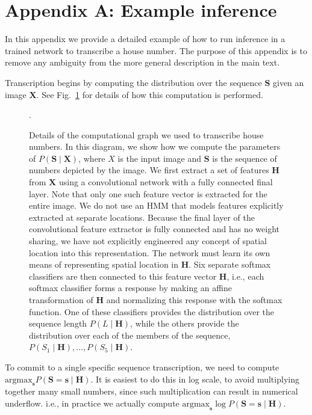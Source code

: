 \documentclass{article} \usepackage{comment}
\begin{document}
\section*{Appendix A: Example inference}

In this appendix we provide a detailed example of how to run inference in a trained network
to transcribe a house number. The purpose of this appendix is to remove any ambiguity from
the more general description in the main text.

Transcription begins by computing the distribution over the sequence $\mathbf{S}$ given an
image $\mathbf{X}$. See Fig.~\ref{fig:detailed_mlp} for details of how this computation is
performed.

\begin{figure}[hb]
\begin{centering}
\caption{Details of the computational graph we used to transcribe house numbers.
In this diagram, we show how we compute the parameters of $P( \mathbf{S} \mid \mathbf{X})$,
where $X$ is the input image and $\mathbf{S}$ is the sequence of numbers depicted by
the image. We first extract a set of features $\mathbf{H}$ from $\mathbf{X}$ using a convolutional
network with a fully connected final layer. Note that only one such feature vector is extracted
for the entire image. We do not use an HMM that models features explicitly extracted at separate
locations. Because the final layer of the convolutional feature extractor is fully connected and
has no weight sharing, we have not explicitly engineered any concept of spatial location into this
representation. The network must learn its own means of representing spatial location in $\mathbf{H}$.
Six separate softmax classifiers are then connected
to this feature vector $\mathbf{H}$, i.e., each softmax classifier forms a response by making an
affine transformation of $\mathbf{H}$ and normalizing this response with the softmax function.
One of these classifiers provides the distribution over the sequence length $P(L \mid \mathbf{H})$,
while the others provide the distribution over each of the members of the sequence,
$P(S_1 \mid \mathbf{H}), \dots, P(S_5 \mid \mathbf{H})$.
}
\label{fig:detailed_mlp}.
\end{centering}
\end{figure}

To commit to a single specific sequence transcription, we need to compute
$\text{argmax}_\mathbf{s} P(\mathbf{S} = \mathbf{s} \mid \mathbf{H} )$.
It is easiest to do this in log scale, to avoid multiplying together many
small numbers, since such multiplication can result in numerical underflow.
i.e., in practice we actually compute
$\text{argmax}_\mathbf{s} \log P(\mathbf{S} = \mathbf{s} \mid \mathbf{H} )$.
\end{document}
